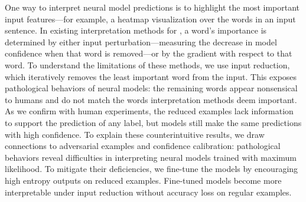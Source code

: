 One way to interpret neural model predictions is to highlight the most
important input features---for example, a heatmap visualization over
the words in an input sentence.  In existing interpretation methods
for \nlp{}, a word's importance is determined by either input
perturbation---measuring the decrease in model confidence when that
word is removed---or by the gradient with respect to that word.  To
understand the limitations of these methods, we use input reduction,
which iteratively removes the least important word from the
input. This exposes pathological behaviors of neural models: the
remaining words appear nonsensical to humans and do not match the
words interpretation methods deem important. As we confirm with human
experiments, the reduced examples lack information to support the
prediction of any label, but models still make the same predictions
with high confidence.  To explain these counterintuitive results, we
draw connections to adversarial examples and confidence calibration:
pathological behaviors reveal difficulties in interpreting neural
models trained with maximum likelihood.  To mitigate their
deficiencies, we fine-tune the models by encouraging high entropy
outputs on reduced examples.  Fine-tuned models become more
interpretable under input reduction without accuracy loss on regular
examples.
